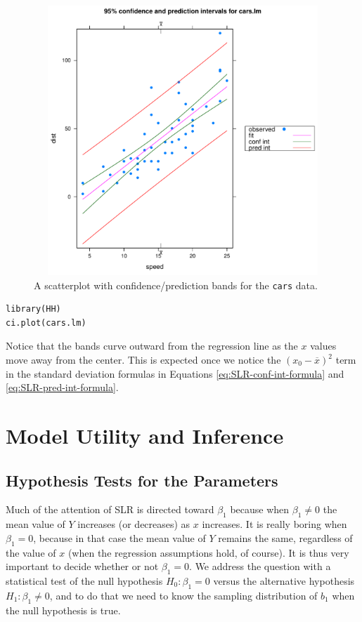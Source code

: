 \documentclass[captions=tableheading]{scrbook}
\begin{document}
\begin{figure}[th]
  \includegraphics[width=5in, height=4in]{img/carscipi.pdf}
  \caption[Scatterplot with confidence/prediction bands for the \texttt{cars} data]{\small A scatterplot with confidence/prediction bands for the \texttt{cars} data.}
  \label{fig:Scatter-cars-CIPI}
\end{figure}


\begin{verbatim}
library(HH)
ci.plot(cars.lm)
\end{verbatim}

Notice that the bands curve outward from the regression line as the \(x\) values move away from the center. This is expected once we notice the \((x_{0}-\overline{x})^{2}\) term in the standard deviation formulas in Equations \ref{eq:SLR-conf-int-formula} and \ref{eq:SLR-pred-int-formula}.
\section{Model Utility and Inference}
\label{sec-11-3}

\label{sec:Model-Utility-SLR}
\subsection{Hypothesis Tests for the Parameters}
\label{sec-11-3-1}

\label{sub:slr-hypoth-test-params}

Much of the attention of SLR is directed toward \(\beta_{1}\) because when \( \beta_{1}\neq 0 \) the mean value of \(Y\) increases (or decreases) as \(x\) increases. It is really boring when \(\beta_{1}=0\), because in that case the mean value of \(Y\) remains the same, regardless of the value of \(x\) (when the regression assumptions hold, of course). It is thus very important to decide whether or not \( \beta_{1} = 0 \). We address the question with a statistical test of the null hypothesis \(H_{0}:\beta_{1}=0\) versus the alternative hypothesis \(H_{1}:\beta_{1}\neq0\), and to do that we need to know the sampling distribution of \(b_{1}\) when the null hypothesis is true.
\end{document}

